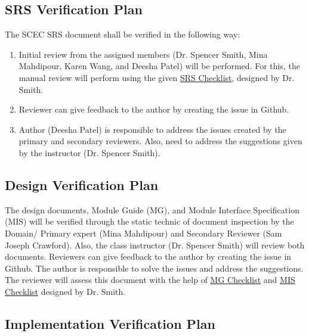 \documentclass[12pt, titlepage]{article}
\begin{document}
\subsection{SRS Verification Plan}

The SCEC SRS document shall be verified in the following way: 

\begin{enumerate}

\item Initial review from the assigned members (Dr. Spencer Smith, Mina Mahdipour, Karen Wang, and Deesha Patel) will be performed. For this, the manual review will perform using the given \href{https://github.com/smiths/capTemplate/blob/9251702fdcb9800c59f6ed3d11d91e2bd62fca6d/docs/Checklists/SRS-Checklist.pdf}{SRS Checklist}, designed by Dr. Smith. 

\item Reviewer can give feedback to the author by creating the issue in Github. 

\item Author (Deesha Patel) is responsible to address the issues created by the primary and secondary reviewers. Also, need to address the suggestions given by the instructor (Dr. Spencer Smith).  

\end{enumerate}


\subsection{Design Verification Plan}

The design documents, Module Guide (MG), and Module Interface Specification (MIS) will be verified through the static technic of document inspection by the Domain/ Primary expert (Mina Mahdipour) and Secondary Reviewer (Sam Joseph Crawford). Also, the class instructor (Dr. Spencer Smith) will review both documents. Reviewers can give feedback to the author by creating the issue in Github. The author is responsible to solve the issues and address the suggestions. The reviewer will assess this document with the help of \href{https://github.com/smiths/capTemplate/blob/9251702fdcb9800c59f6ed3d11d91e2bd62fca6d/docs/Checklists/MG-Checklist.pdf}{MG Checklist} and \href{https://github.com/smiths/capTemplate/blob/9251702fdcb9800c59f6ed3d11d91e2bd62fca6d/docs/Checklists/MIS-Checklist.pdf}{MIS Checklist} designed by Dr. Smith.      

\subsection{Implementation Verification Plan}
\end{document}
